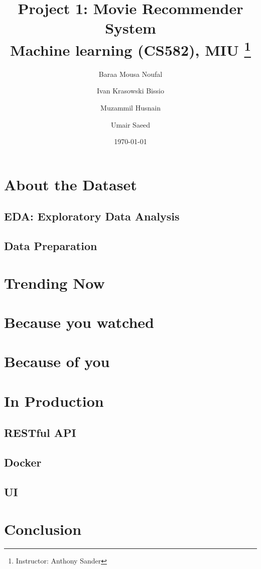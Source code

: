 \documentclass[titlepage, 11pt]{article}
\title{
	\textbf{Project 1: Movie Recommender System} \\
	Machine learning (CS582), MIU \thanks{Instructor: Anthony Sander}
}
\author{
    Baraa Mousa Noufal \and Ivan Krasowski Bissio
        \and Muzammil Husnain \and Umair Saeed
}
\date{\today}
\begin{document}
\maketitle
\tableofcontents

\begin{abstract}
	
\end{abstract}

\section{About the Dataset}

\subsection{EDA: Exploratory Data Analysis}


\subsection{Data Preparation}


\section{Trending Now}


\section{Because you watched}


\section{Because of you}


\section{In Production}
\subsection{RESTful API}

\subsection{Docker}

\subsection{UI}


\section{Conclusion}

\end{document}

